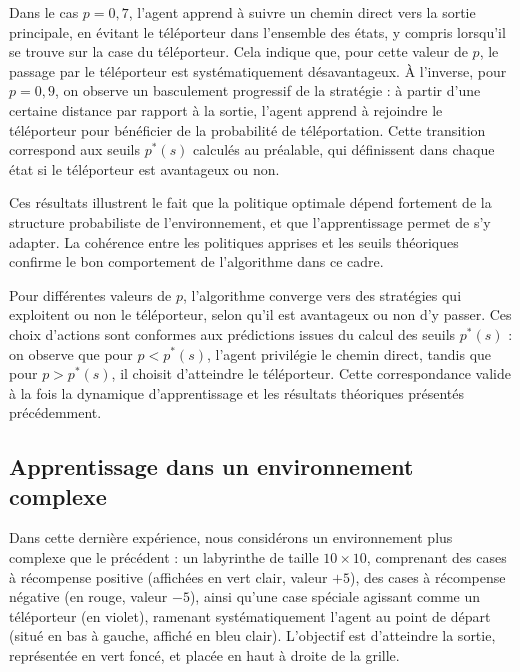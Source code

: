 \documentclass[12pt]{article}
\begin{document}
Dans le cas \( p = 0{,}7 \), l’agent apprend à suivre un chemin direct vers la sortie principale, en évitant le téléporteur dans l’ensemble des états, y compris lorsqu’il se trouve sur la case du téléporteur. Cela indique que, pour cette valeur de \( p \), le passage par le téléporteur est systématiquement désavantageux.
À l’inverse, pour \( p = 0{,}9 \), on observe un basculement progressif de la stratégie : à partir d’une certaine distance par rapport à la sortie, l’agent apprend à rejoindre le téléporteur pour bénéficier de la probabilité de téléportation. Cette transition correspond aux seuils \( p^*(s) \) calculés au préalable, qui définissent dans chaque état si le téléporteur est avantageux ou non.

Ces résultats illustrent le fait que la politique optimale dépend fortement de la structure probabiliste de l’environnement, et que l’apprentissage permet de s’y adapter. La cohérence entre les politiques apprises et les seuils théoriques confirme le bon comportement de l’algorithme dans ce cadre.



Pour différentes valeurs de \( p \), l’algorithme converge vers des stratégies qui exploitent ou non le téléporteur, selon qu’il est avantageux ou non d’y passer. Ces choix d’actions sont conformes aux prédictions issues du calcul des seuils \( p^*(s) \) : on observe que pour \( p < p^*(s) \), l’agent privilégie le chemin direct, tandis que pour \( p > p^*(s) \), il choisit d’atteindre le téléporteur. Cette correspondance valide à la fois la dynamique d’apprentissage et les résultats théoriques présentés précédemment.

\subsection{Apprentissage dans un environnement complexe}

Dans cette dernière expérience, nous considérons un environnement plus complexe que le précédent : un labyrinthe de taille \(10 \times 10\), comprenant des cases à récompense positive (affichées en vert clair, valeur \(+5\)), des cases à récompense négative (en rouge, valeur \(−5\)), ainsi qu’une case spéciale agissant comme un téléporteur (en violet), ramenant systématiquement l’agent au point de départ (situé en bas à gauche, affiché en bleu clair). L’objectif est d’atteindre la sortie, représentée en vert foncé, et placée en haut à droite de la grille.
\end{document}

